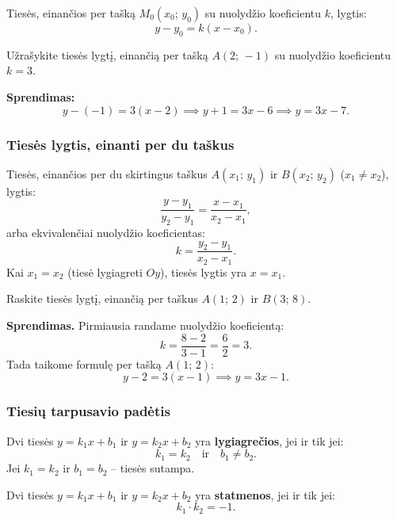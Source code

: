 \begin{theorem}
Tiesės, einančios per tašką $M_0(x_0;\, y_0)$ su nuolydžio koeficientu $k$, lygtis:
\[
    y - y_0 = k(x - x_0).
\]
\end{theorem}

\begin{example}
Užrašykite tiesės lygtį, einančią per tašką $A(2;\, -1)$ su nuolydžio koeficientu $k = 3$.

\textbf{Sprendimas:}
\[
    y - (-1) = 3(x - 2) \implies y + 1 = 3x - 6 \implies y = 3x - 7.
\]
\end{example}

\subsubsection*{Tiesės lygtis, einanti per du taškus}

\begin{theorem}
Tiesės, einančios per du skirtingus taškus $A(x_1;\, y_1)$ ir $B(x_2;\, y_2)$ ($x_1 \neq x_2$), lygtis:
\[
    \frac{y - y_1}{y_2 - y_1} = \frac{x - x_1}{x_2 - x_1},
\]
arba ekvivalenčiai nuolydžio koeficientas:
\[
    k = \frac{y_2 - y_1}{x_2 - x_1}.
\]
Kai $x_1 = x_2$ (tiesė lygiagreti $Oy$), tiesės lygtis yra $x = x_1$.
\end{theorem}

\begin{example}
Raskite tiesės lygtį, einančią per taškus $A(1;\, 2)$ ir $B(3;\, 8)$.

\textbf{Sprendimas.} Pirmiausia randame nuolydžio koeficientą:
\[
    k = \frac{8 - 2}{3 - 1} = \frac{6}{2} = 3.
\]
Tada taikome formulę per tašką $A(1;\,2)$:
\[
    y - 2 = 3(x - 1) \implies y = 3x - 1.
\]
\end{example}

\subsubsection*{Tiesių tarpusavio padėtis}

\begin{theorem}
Dvi tiesės $y = k_1 x + b_1$ ir $y = k_2 x + b_2$ yra \textbf{lygiagrečios}, jei ir tik jei:
\[
    k_1 = k_2 \quad \text{ir} \quad b_1 \neq b_2.
\]
Jei $k_1 = k_2$ ir $b_1 = b_2$ – tiesės sutampa.
\end{theorem}

\begin{theorem}
Dvi tiesės $y = k_1 x + b_1$ ir $y = k_2 x + b_2$ yra \textbf{statmenos}, jei ir tik jei:
\[
    k_1 \cdot k_2 = -1.
\]
\end{theorem}

